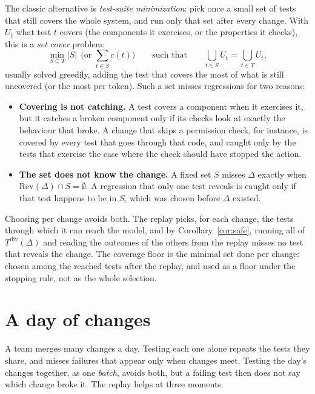 \documentclass[11pt,a4paper]{article}
\newcommand{\Tdiv}{T^{\mathrm{div}}(\Delta)}
\begin{document}
The classic alternative is \emph{test-suite minimization}: pick once a small set of tests that still covers the
whole system, and run only that set after every change. With $U_t$ what test $t$ covers (the components it
exercises, or the properties it checks), this is a \emph{set cover} problem:
\[
  \min_{S \subseteq T} |S| \ \ \text{(or } \textstyle\sum_{t \in S} c(t)\text{)} \qquad \text{such that} \qquad
  \bigcup_{t \in S} U_t = \bigcup_{t \in T} U_t ,
\]
usually solved greedily, adding the test that covers the most of what is still uncovered (or the most per token).
Such a set misses regressions for two reasons:
\begin{itemize}
  \item \textbf{Covering is not catching.} A test covers a component when it exercises it, but it catches a broken
        component only if its checks look at exactly the behaviour that broke. A change that skips a permission
        check, for instance, is covered by every test that goes through that code, and caught only by the tests
        that exercise the case where the check should have stopped the action.
  \item \textbf{The set does not know the change.} A fixed set $S$ misses $\Delta$ exactly when
        $\mathrm{Rev}(\Delta) \cap S = \emptyset$. A regression that only one test reveals is caught only if that
        test happens to be in $S$, which was chosen before $\Delta$ existed.
\end{itemize}
Choosing per change avoids both. The replay picks, for each change, the tests through which it can reach the model,
and by Corollary~\ref{cor:safe}, running all of $\Tdiv$ and reading the outcomes of the others from the replay
misses no test that reveals the change. The coverage floor is the minimal set done per change: chosen among the
reached tests after the replay, and used as a floor under the stopping rule, not as the whole selection.

\section{A day of changes}
\label{sec:day}

A team merges many changes a day. Testing each one alone repeats the tests they share, and misses failures that
appear only when changes meet. Testing the day's changes together, as one \emph{batch}, avoids both, but a failing
test then does not say which change broke it. The replay helps at three moments.
\end{document}
